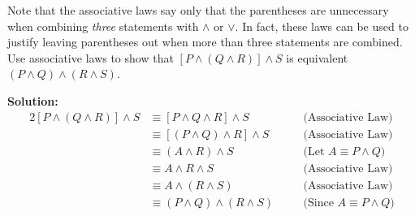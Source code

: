Note that the associative laws say only that the parentheses are unnecessary when combining \textit{three} statements with $\wedge$ or $\vee$. In fact, these laws can be used to justify leaving parentheses out when more than three statements are combined. Use associative laws to show that $[P \wedge (Q \wedge R)] \wedge S$ is equivalent $(P \wedge Q) \wedge (R \wedge S)$.

\textbf{Solution:}
\begin{alignat*}{2}
    [P \wedge (Q \wedge R)] \wedge S & \equiv [P \wedge Q \wedge R] \wedge S \quad && \text{(Associative Law)} \\
    & \equiv [(P \wedge Q) \wedge R] \wedge S \quad && \text{(Associative Law)} \\
    & \equiv (A \wedge R) \wedge S \quad && \text{(Let $A \equiv P \wedge Q$)} \\
    & \equiv A \wedge R \wedge S \quad && \text{(Associative Law)} \\
    & \equiv A \wedge (R \wedge S) \quad && \text{(Associative Law)} \\
    & \equiv (P \wedge Q) \wedge (R \wedge S) \quad && \text{(Since $A \equiv P \wedge Q$)} \\
\end{alignat*}

\pagebreak
